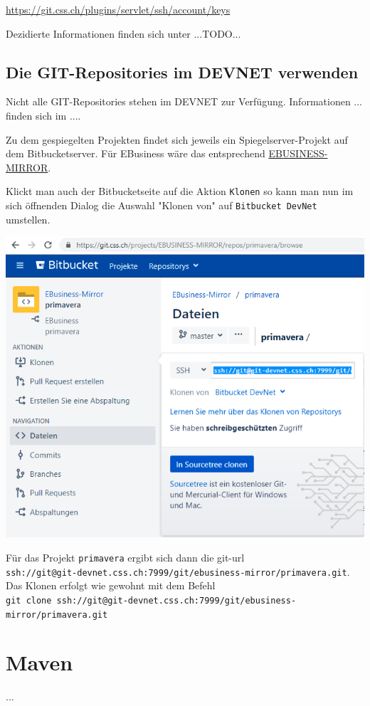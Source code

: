 \documentclass[]{article}
\newcommand{\code}[1]{\texttt{#1}}
\begin{document}
\href{https://git.css.ch/plugins/servlet/ssh/account/keys}{https://git.css.ch/plugins/servlet/ssh/account/keys}

Dezidierte Informationen finden sich unter ...TODO...

\subsection{Die GIT-Repositories im DEVNET verwenden}
Nicht alle GIT-Repositories stehen im DEVNET zur Verfügung. Informationen ... finden sich im ....

Zu dem gespiegelten Projekten findet sich jeweils ein Spiegelserver-Projekt auf dem Bitbucketserver. 
Für EBusiness wäre das entsprechend \href{https://git.css.ch/projects/EBUSINESS-MIRROR}{EBUSINESS-MIRROR}.

Klickt man auch der Bitbucketseite auf die Aktion \code{Klonen} so kann man nun im sich öffnenden Dialog die Auswahl "Klonen von" auf \code{Bitbucket DevNet} umstellen.

\includegraphics[scale=0.3]{assets/clone.png}

Für das Projekt \code{primavera} ergibt sich dann die git-url \\
\code{ssh://git@git-devnet.css.ch:7999/git/ebusiness-mirror/primavera.git}. Das Klonen erfolgt wie gewohnt mit dem Befehl \\
\code{git clone ssh://git@git-devnet.css.ch:7999/git/ebusiness-mirror/primavera.git}

\section{Maven}
...
\end{document}
